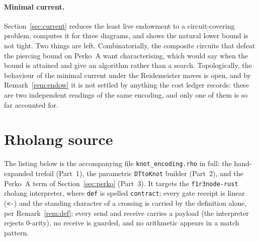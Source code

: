 \documentclass[11pt]{article}
\theoremstyle{definition}
\begin{document}
\paragraph{Minimal current.}
Section~\ref{sec:current} reduces the least live endowment to a circuit-covering
problem, computes it for three diagrams, and shows the natural lower bound is not
tight. Two things are left. Combinatorially, the composite circuits that defeat
the piercing bound on Perko~A want characterising, which would say when the bound
is attained and give an algorithm rather than a search. Topologically, the
behaviour of the minimal current under the Reidemeister moves is open, and by
Remark~\ref{rem:endow} it is not settled by anything the cost ledger records:
these are two independent readings of the same encoding, and only one of them is
so far accounted for.

\appendix
\section{Rholang source}\label{app:src}
The listing below is the accompanying file \texttt{knot\_encoding.rho} in full: the
hand-expanded trefoil (Part~1), the parametric \texttt{DTtoKnot} builder (Part~2),
and the Perko~A term of Section~\ref{sec:perko} (Part~3). It targets the
\texttt{f1r3node-rust} rholang interpreter, where \texttt{def} is spelled
\texttt{contract}; every gate receipt is linear (\texttt{<-}) and the standing
character of a crossing is carried by the definition alone, per
Remark~\ref{rem:def}; every send and receive carries a payload (the interpreter rejects $0$-arity), no receive is
guarded, and no arithmetic appears in a match pattern.


\end{document}
